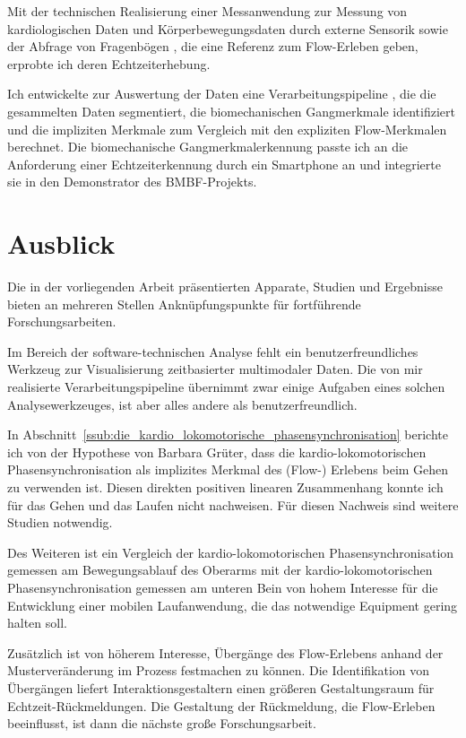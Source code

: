 Mit der technischen Realisierung einer Messanwendung zur Messung von kardiologischen Daten und Körperbewegungsdaten durch externe Sensorik sowie der Abfrage von Fragenbögen \citep{Bogutzky2016}, die eine Referenz zum Flow-Erleben geben, erprobte ich deren Echtzeiterhebung. 

Ich entwickelte zur Auswertung der Daten eine Verarbeitungspipeline \citep{Bogutzky2016a}, die die gesammelten Daten segmentiert, die biomechanischen Gangmerkmale identifiziert und die impliziten Merkmale zum Vergleich mit den expliziten Flow-Merkmalen berechnet. Die biomechanische Gangmerkmalerkennung passte ich an die Anforderung einer Echtzeiterkennung durch ein Smartphone an und integrierte sie in den Demonstrator des \acs{BMBF}-Projekts. 

\section{Ausblick} \label{sec:ausblick} Die in der vorliegenden Arbeit präsentierten Apparate, Studien und Ergebnisse bieten an mehreren Stellen Anknüpfungspunkte für fortführende Forschungsarbeiten.

Im Bereich der software-technischen Analyse fehlt ein benutzerfreundliches Werkzeug zur Visualisierung zeitbasierter multimodaler Daten. Die von mir realisierte Verarbeitungspipeline übernimmt zwar einige Aufgaben eines solchen Analysewerkzeuges, ist aber alles andere als benutzerfreundlich. 

In Abschnitt~\ref{ssub:die_kardio_lokomotorische_phasensynchronisation} berichte ich von der Hypothese von Barbara Grüter, dass die kardio-lokomotorischen Phasensynchronisation als implizites Merkmal des (Flow-) Erlebens beim Gehen zu verwenden ist. Diesen direkten positiven linearen Zusammenhang konnte ich für das Gehen und das Laufen nicht nachweisen. Für diesen Nachweis sind weitere Studien notwendig.

Des Weiteren ist ein Vergleich der kardio-lokomotorischen Phasensynchronisation gemessen am Bewegungsablauf des Oberarms mit der kardio-lokomotorischen Phasensynchronisation gemessen am unteren Bein von hohem Interesse für die Entwicklung einer mobilen Laufanwendung, die das notwendige Equipment gering halten soll.

Zusätzlich ist von höherem Interesse, Übergänge des Flow-Erlebens anhand der Musterveränderung im Prozess festmachen zu können. Die Identifikation von Übergängen liefert Interaktionsgestaltern einen größeren Gestaltungsraum für Echtzeit-Rückmeldungen. Die Gestaltung der Rückmeldung, die Flow-Erleben beeinflusst, ist dann die nächste große Forschungsarbeit.


